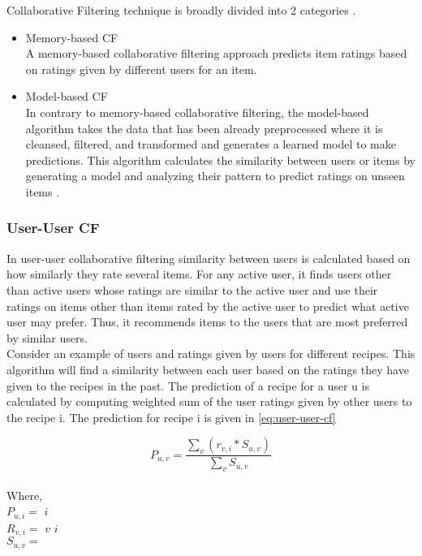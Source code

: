 \noindent Collaborative Filtering technique is broadly divided into 2 categories \cite{11}. 
\\
\begin{itemize}
\item Memory-based CF \\
A memory-based collaborative filtering approach predicts item ratings based on ratings given by different users for an item.
\item Model-based CF \\
In contrary to memory-based collaborative filtering, the model-based algorithm takes the data that has been already preprocessed where it is cleansed, filtered, and transformed and generates a learned model to make predictions. This algorithm calculates the similarity between users or items by generating a model and analyzing their pattern to predict ratings on unseen items \cite{28,29,30}.
\end{itemize}

\subsubsection{User-User CF}

In user-user collaborative filtering similarity between users is calculated based on how similarly they rate several items. For any active user, it finds users other than active users whose ratings are similar to the active user and use their ratings on items other than items rated by the active user to predict what active user may prefer. Thus, it recommends items to the users that are most preferred by similar users.
\\
Consider an example of users and ratings given by users for different recipes. This algorithm will find a similarity between each user based on the ratings they have given to the recipes in the past. The prediction of a recipe for a user u is calculated by computing weighted sum of the user ratings given by other users to the recipe i.
The prediction for recipe i is given in \autoref{eq:user-user-cf}

\begin{equation}
P_{u,v} = \frac { \sum_v(r_{v,i} * S_{u,v})}{\sum_v S_{u,v}}
\label{eq:user-user-cf}
\end{equation}
\\
Where, 
\\
\noindent
$P_{u,i} = $  $i$ 
\\
$R_{v,i} = $  $v$  $i$ 
\\
$S_{u,v} = $ 
\\

